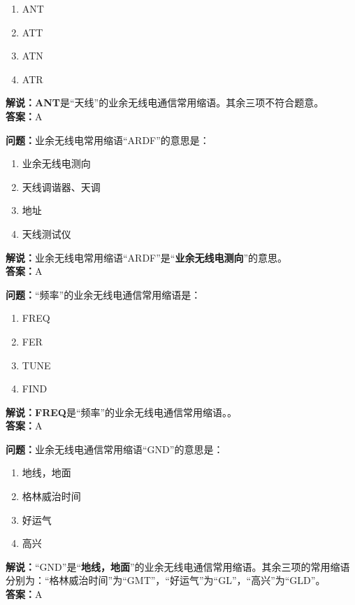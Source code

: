 \begin{enumerate}[label=\Alph*), leftmargin=1cm]
	\item ANT
	\item ATT
	\item ATN
	\item ATR
\end{enumerate}

\textbf{解说：}\textbf{ANT}是“天线”的业余无线电通信常用缩语。其余三项不符合题意。\\\textbf{答案：}A



\textbf{问题：}业余无线电常用缩语“ARDF”的意思是：

\begin{enumerate}[label=\Alph*), leftmargin=1cm]
	\item 业余无线电测向
	\item 天线调谐器、天调
	\item 地址
	\item 天线测试仪
\end{enumerate}

\textbf{解说：}业余无线电常用缩语“ARDF”是“\textbf{业余无线电测向}”的意思。\\\textbf{答案：}A



\textbf{问题：}“频率”的业余无线电通信常用缩语是：
\begin{enumerate}[label=\Alph*), leftmargin=1cm]
	\item FREQ
	\item FER
	\item TUNE
	\item FIND
\end{enumerate}

\textbf{解说：}\textbf{FREQ}是“频率”的业余无线电通信常用缩语。。\\\textbf{答案：}A



\textbf{问题：}业余无线电通信常用缩语“GND”的意思是：

\begin{enumerate}[label=\Alph*), leftmargin=1cm]
	\item 地线，地面
	\item 格林威治时间
	\item 好运气
	\item 高兴
\end{enumerate}

\textbf{解说：}“GND”是“\textbf{地线，地面}”的业余无线电通信常用缩语。其余三项的常用缩语分别为：“格林威治时间”为“GMT”，“好运气”为“GL”，“高兴”为“GLD”。\\\textbf{答案：}A



